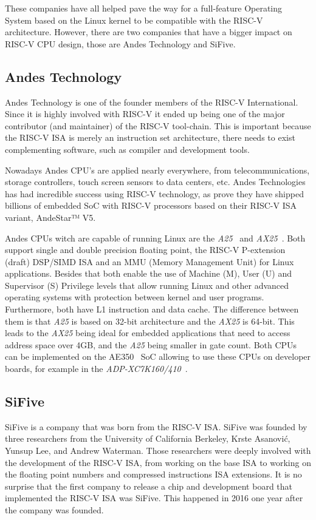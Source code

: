 These companies have all helped pave the way for a full-feature Operating System based on the Linux kernel to be compatible with the RISC-V architecture. However, there are two companies that have a bigger impact on RISC-V CPU design, those are Andes Technology and SiFive.

\subsection{Andes Technology}
Andes Technology is one of the founder members of the RISC-V International. Since it is highly involved with RISC-V it ended up being one of the major contributor (and maintainer) of the RISC-V tool-chain. This is important because the RISC-V ISA is merely an instruction set architecture, there needs to exist complementing software, such as compiler and development tools.

Nowadays Andes CPU's are applied nearly everywhere, from telecommunications, storage controllers, touch screen sensors to data centers, etc. Andes Technologies has had incredible success using RISC-V technology, as prove they have shipped billions of embedded SoC with RISC-V processors based on their RISC-V ISA variant, AndeStar™ V5. 

Andes CPUs witch are capable of running Linux are the \textit{A25}~\cite{a25} and \textit{AX25}~\cite{ax25}. Both support single and double precision floating point, the RISC-V P-extension (draft) DSP/SIMD ISA and an MMU (Memory Management Unit) for Linux applications. Besides that both enable the use of Machine (M), User (U) and Supervisor (S) Privilege levels that allow running Linux and other advanced operating systems with protection between kernel and user programs. Furthermore, both have L1 instruction and data cache. The difference between them is that \textit{A25} is based on 32-bit architecture and the \textit{AX25} is 64-bit. This leads to the \textit{AX25} being ideal for embedded applications that need to access address space over 4GB, and the \textit{A25} being smaller in gate count. Both CPUs can be implemented on the AE350~\cite{ae350} SoC allowing to use these CPUs on developer boards, for example in the \textit{ADP-XC7K160/410}~\cite{adp-xc7k160}.

\subsection{SiFive}
SiFive is a company that was born from the RISC-V ISA. SiFive was founded by three researchers from the University of California Berkeley, Krste Asanović, Yunsup Lee, and Andrew Waterman. Those researchers were deeply involved with the development of the RISC-V ISA, from working on the base ISA to working on the floating point numbers and compressed instructions ISA extensions. It is no surprise that the first company to release a chip and development board that implemented the RISC-V ISA was SiFive. This happened in 2016 one year after the company was founded.

